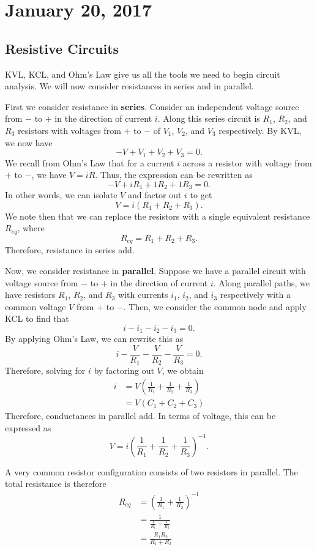 \documentclass[11pt]{article}
\theoremstyle{plain} %
\theoremstyle{definition}
\theoremstyle{example}
\theoremstyle{remark}
\begin{document}
\section{January 20, 2017}
\subsection{Resistive Circuits}

KVL, KCL, and Ohm's Law give us all the tools we need to begin circuit analysis. We will now consider resistances in series and in parallel. 

First we consider resistance in \textbf{series}. Consider an independent voltage source from $-$ to $+$ in the direction of current $i$. Along this series circuit is $R_1$, $R_2$, and $R_3$ resistors with voltages from $+$ to $-$ of $V_1$, $V_2$, and $V_3$ respectively. By KVL, we now have 
$$-V + V_1 + V_2 + V_3 = 0.$$
We recall from Ohm's Law that for a current $i$ across a resistor with voltage from $+$ to $-$, we have $V = iR$. Thus, the expression can be rewritten as 
$$-V + iR_1 + 1R_2 + 1R_3 = 0.$$ In other words, we can isolate $V$ and factor out $i$ to get
$$V = i\left(R_1 + R_2 + R_3\right).$$
We note then that we can replace the resistors with a single equivalent resistance $R_{eq}$, where 
$$R_{eq} = R_1 + R_2 + R_3.$$
Therefore, resistance in series add. 

Now, we consider resistance in \textbf{parallel}. Suppose we have a parallel circuit with voltage source from $-$ to $+$ in the direction of current $i$. Along parallel paths, we have resistors $R_1$, $R_2$, and $R_3$ with currents $i_1$, $i_2$, and $i_3$ respectively with a common voltage $V$ from $+$ to $-$. Then, we consider the common node and apply KCL to find that $$i -i_1 -i_2-i_3=0.$$ By applying Ohm's Law, we can rewrite this as 
$$i-\frac{V}{R_1} -\frac{V}{R_2} - \frac{V}{R_3} = 0.$$
Therefore, solving for $i$ by factoring out $V$, we obtain 
\begin{align*}
i &= V\left(\frac{1}{R_1} + \frac{1}{R_2} + \frac{1}{R_3}\right)\\
&= V(C_1+C_2+C_3)
\end{align*}
Therefore, conductances in parallel add. In terms of voltage, this can be expressed as 
$$V = i\left(\frac{1}{R_1} + \frac{1}{R_2} + \frac{1}{R_3}\right)^{-1}.$$

A very common resistor configuration consists of two resistors in parallel. The total resistance is therefore
\begin{align*}
R_{eq} &= \left(\frac{1}{R_1} + \frac{1}{R_2}\right)^{-1}\\
&=\frac{1}{\frac{1}{R_1} + \frac{1}{R_2}}\\
&= \frac{R_1R_2}{R_1+R_2}
\end{align*}
\end{document}
